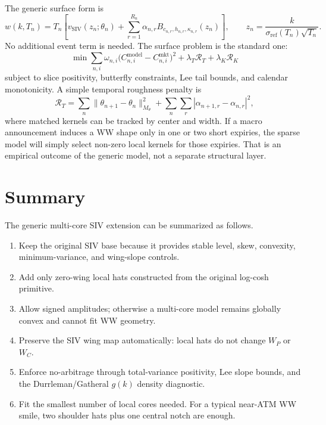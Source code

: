 \documentclass[11pt]{article}
\newcommand{\sigref}{\sigma_{\mathrm{ref}}}
\begin{document}
The generic surface form is
\begin{equation}
  w(k,T_n)
  =T_n\left[
    v_{\mathrm{SIV}}(z_n;\theta_n)
    +\sum_{r=1}^{R_n}\alpha_{n,r}B_{c_{n,r},h_{n,r},\kappa_{n,r}}(z_n)
  \right],
  \qquad
  z_n=\frac{k}{\sigref(T_n)\sqrt{T_n}}.
  \label{eq:surface-form}
\end{equation}
No additional event term is needed.  The surface problem is the standard one:
\begin{equation}
  \min \sum_{n,i}\omega_{n,i}\big(C_{n,i}^{\mathrm{model}}-C_{n,i}^{\mathrm{mkt}}\big)^2
  +\lambda_T\mathcal{R}_T
  +\lambda_K\mathcal{R}_K
  \label{eq:surface-objective}
\end{equation}
subject to slice positivity, butterfly constraints, Lee tail bounds, and calendar monotonicity.  A simple temporal roughness penalty is
\begin{equation}
  \mathcal{R}_T
  =\sum_n\|\theta_{n+1}-\theta_n\|_{M_\theta}^2
  +\sum_n\sum_r |\alpha_{n+1,r}-\alpha_{n,r}|^2,
  \label{eq:temporal-regularity}
\end{equation}
where matched kernels can be tracked by center and width.  If a macro announcement induces a WW shape only in one or two short expiries, the sparse model will simply select non-zero local kernels for those expiries.  That is an empirical outcome of the generic model, not a separate structural layer.

\section{Summary}

The generic multi-core SIV extension can be summarized as follows.
\begin{enumerate}[leftmargin=2em]
  \item Keep the original SIV base because it provides stable level, skew, convexity, minimum-variance, and wing-slope controls.
  \item Add only zero-wing local hats constructed from the original log-cosh primitive.
  \item Allow signed amplitudes; otherwise a multi-core model remains globally convex and cannot fit WW geometry.
  \item Preserve the SIV wing map automatically: local hats do not change $W_P$ or $W_C$.
  \item Enforce no-arbitrage through total-variance positivity, Lee slope bounds, and the Durrleman/Gatheral $g(k)$ density diagnostic.
  \item Fit the smallest number of local cores needed.  For a typical near-ATM WW smile, two shoulder hats plus one central notch are enough.
\end{enumerate}
\end{document}
